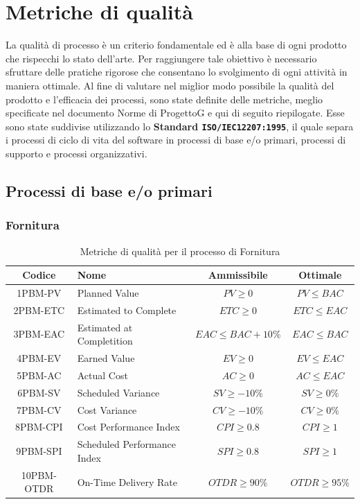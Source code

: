 \documentclass{article}
\begin{document}
\section{Metriche di qualità}
La qualità di processo è un criterio fondamentale ed è alla base di ogni prodotto che
rispecchi lo stato dell’arte. Per raggiungere tale obiettivo è necessario sfruttare delle
pratiche rigorose che consentano lo svolgimento di ogni attività in maniera ottimale.
Al fine di valutare nel miglior modo possibile la qualità del prodotto e l’efficacia dei
processi, sono state definite delle metriche, meglio specificate nel documento Norme
di ProgettoG e qui di seguito riepilogate. Esse sono state suddivise utilizzando lo \textbf{Standard \texttt{ISO/IEC12207:1995}}, il quale separa i processi di ciclo di vita del software in processi di
base e/o primari, processi di supporto e processi organizzativi.
\subsection{Processi di base e/o primari}
\subsubsection{Fornitura} %
\begin{table}[H]
    \centering
    \renewcommand{\arraystretch}{1.5} %
    \begin{tabular}{|c|l|c|c|}
        \hline
        \textbf{Codice} & \textbf{Nome} & \textbf{Ammissibile} & \textbf{Ottimale} \\
        \hline
        1PBM-PV & Planned Value & $PV \geq 0$ & $PV \leq BAC$ \\
        2PBM-ETC & Estimated to Complete & $ETC \geq 0$ & $ETC \leq EAC$ \\
        3PBM-EAC & Estimated at Completition & $EAC \leq BAC + 10\%$ & $EAC \leq BAC$ \\
        4PBM-EV & Earned Value & $EV \geq 0$ & $EV \leq EAC$ \\
        5PBM-AC & Actual Cost & $AC \geq 0$ & $AC \leq EAC$ \\
        6PBM-SV & Scheduled Variance & $SV \geq -10\%$ & $SV \geq 0\%$ \\
        7PBM-CV & Cost Variance & $CV \geq -10\%$ & $CV \geq 0\%$ \\
        8PBM-CPI & Cost Performance Index & $CPI \geq 0.8$ & $CPI \geq 1$ \\
        9PBM-SPI & Scheduled Performance Index & $SPI \geq 0.8$ & $SPI \geq 1$ \\
        10PBM-OTDR & On-Time Delivery Rate & $OTDR \geq 90\%$ & $OTDR \geq 95\%$ \\
        \hline
    \end{tabular}
    \label{tab:fornitura}
    \caption{Metriche di qualità per il processo di Fornitura}
\end{table}
\end{document}
